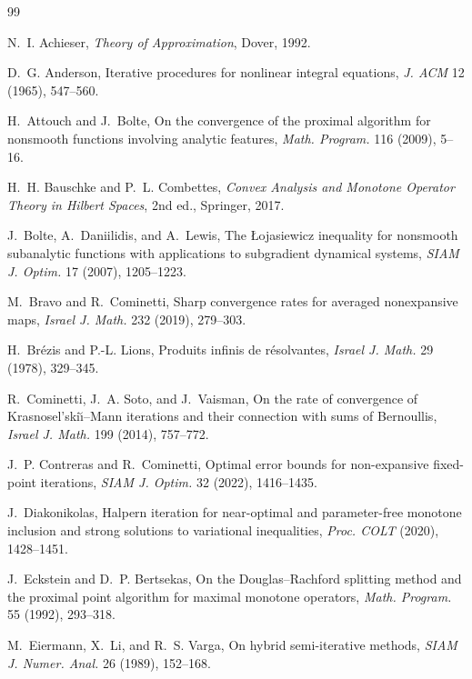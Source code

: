 \documentclass[11pt]{article}
\theoremstyle{definition}
\theoremstyle{remark}
\begin{document}
\begin{thebibliography}{99}

N.~I. Achieser, \emph{Theory of Approximation}, Dover, 1992.

D.~G. Anderson, Iterative procedures for nonlinear integral equations,
\emph{J. ACM} 12 (1965), 547--560.

H.~Attouch and J.~Bolte, On the convergence of the proximal algorithm for
nonsmooth functions involving analytic features, \emph{Math. Program.} 116
(2009), 5--16.

H.~H. Bauschke and P.~L. Combettes, \emph{Convex Analysis and Monotone
Operator Theory in Hilbert Spaces}, 2nd ed., Springer, 2017.

J.~Bolte, A.~Daniilidis, and A.~Lewis, The {\L}ojasiewicz inequality for
nonsmooth subanalytic functions with applications to subgradient dynamical
systems, \emph{SIAM J. Optim.} 17 (2007), 1205--1223.

M.~Bravo and R.~Cominetti, Sharp convergence rates for averaged
nonexpansive maps, \emph{Israel J. Math.} 232 (2019), 279--303.

H.~Br\'ezis and P.-L. Lions, Produits infinis de r\'esolvantes,
\emph{Israel J. Math.} 29 (1978), 329--345.

R.~Cominetti, J.~A. Soto, and J.~Vaisman, On the rate of convergence of
Krasnosel'ski{\u\i}--Mann iterations and their connection with sums of
Bernoullis, \emph{Israel J. Math.} 199 (2014), 757--772.

J.~P. Contreras and R.~Cominetti, Optimal error bounds for non-expansive
fixed-point iterations, \emph{SIAM J. Optim.} 32 (2022), 1416--1435.

J.~Diakonikolas, Halpern iteration for near-optimal and parameter-free
monotone inclusion and strong solutions to variational inequalities,
\emph{Proc. COLT} (2020), 1428--1451.

J.~Eckstein and D.~P. Bertsekas, On the Douglas--Rachford splitting method
and the proximal point algorithm for maximal monotone operators,
\emph{Math. Program.} 55 (1992), 293--318.

M.~Eiermann, X.~Li, and R.~S. Varga, On hybrid semi-iterative methods,
\emph{SIAM J. Numer. Anal.} 26 (1989), 152--168.


\end{thebibliography}
\end{document}
